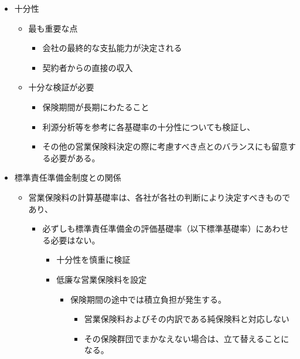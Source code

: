 \documentclass[
]{article}
\providecommand{\tightlist}{%
  \setlength{\itemsep}{0pt}\setlength{\parskip}{0pt}}
\begin{document}
\begin{itemize}
\tightlist
\item
  十分性

  \begin{itemize}
  \tightlist
  \item
    最も重要な点

    \begin{itemize}
    \tightlist
    \item
      会社の最終的な支払能力が決定される
    \item
      契約者からの直接の収入
    \end{itemize}
  \item
    十分な検証が必要

    \begin{itemize}
    \tightlist
    \item
      保険期間が長期にわたること
    \item
      利源分析等を参考に各基礎率の十分性についても検証し、
    \item
      その他の営業保険料決定の際に考慮すべき点とのバランスにも留意する必要がある。
    \end{itemize}
  \end{itemize}
\item
  標準責任準備金制度との関係

  \begin{itemize}
  \tightlist
  \item
    営業保険料の計算基礎率は、各社が各社の判断により決定すべきものであり、

    \begin{itemize}
    \tightlist
    \item
      必ずしも標準責任準備金の評価基礎率（以下標準基礎率）にあわせる必要はない。

      \begin{itemize}
      \tightlist
      \item
        十分性を慎重に検証
      \item
        低廉な営業保険料を設定

        \begin{itemize}
        \tightlist
        \item
          保険期間の途中では積立負担が発生する。

          \begin{itemize}
          \tightlist
          \item
            営業保険料およびその内訳である純保険料と対応しない
          \item
            その保険群団でまかなえない場合は、立て替えることになる。


\end{itemize}
\end{itemize}
\end{itemize}
\end{itemize}
\end{itemize}
\end{itemize}
\end{document}
